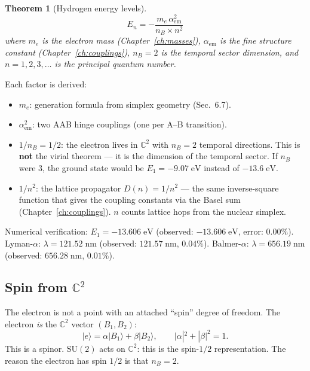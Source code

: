 \documentclass[12pt]{article}
\newtheorem{theorem}{Theorem}[section]
\theoremstyle{remark}
\theoremstyle{definition}
\begin{document}
\begin{theorem}[Hydrogen energy levels]
\begin{equation}
\boxed{E_n = -\frac{m_e\,\alpha_\text{em}^2}{n_B \times n^2}}
\end{equation}
where $m_e$ is the electron mass (Chapter~\ref{ch:masses}), $\alpha_\text{em}$ is the fine structure constant (Chapter~\ref{ch:couplings}), $n_B = 2$ is the temporal sector dimension, and $n = 1, 2, 3, \ldots$ is the principal quantum number.
\end{theorem}

Each factor is derived:
\begin{itemize}
\item $m_e$: generation formula from simplex geometry (Sec.~6.7).
\item $\alpha_\text{em}^2$: two AAB hinge couplings (one per A--B transition).
\item $1/n_B = 1/2$: the electron lives in $\mathbb{C}^2$ with $n_B = 2$ temporal directions. This is \textbf{not} the virial theorem --- it is the dimension of the temporal sector. If $n_B$ were 3, the ground state would be $E_1 = -9.07\;\text{eV}$ instead of $-13.6\;\text{eV}$.
\item $1/n^2$: the lattice propagator $D(n) = 1/n^2$ --- the same inverse-square function that gives the coupling constants via the Basel sum (Chapter~\ref{ch:couplings}). $n$ counts lattice hops from the nuclear simplex.
\end{itemize}

Numerical verification: $E_1 = -13.606\;\text{eV}$ (observed: $-13.606\;\text{eV}$, error: $0.00\%$). Lyman-$\alpha$: $\lambda = 121.52\;\text{nm}$ (observed: $121.57\;\text{nm}$, $0.04\%$). Balmer-$\alpha$: $\lambda = 656.19\;\text{nm}$ (observed: $656.28\;\text{nm}$, $0.01\%$).

\subsection{Spin from $\mathbb{C}^2$}

The electron is not a point with an attached ``spin'' degree of freedom. The electron \emph{is} the $\mathbb{C}^2$ vector $(B_1, B_2)$:
\begin{equation}
|e\rangle = \alpha|B_1\rangle + \beta|B_2\rangle, \qquad |\alpha|^2 + |\beta|^2 = 1.
\end{equation}
This is a spinor. $\text{SU}(2)$ acts on $\mathbb{C}^2$: this is the spin-$1/2$ representation. The reason the electron has spin $1/2$ is that $n_B = 2$.
\end{document}
